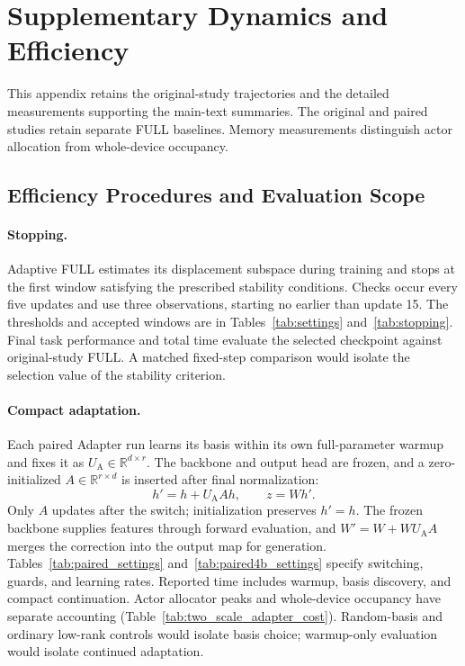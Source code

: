 \FloatBarrier
\section{Supplementary Dynamics and Efficiency}
\label{app:supplementary}
This appendix retains the original-study trajectories and the detailed measurements supporting the main-text summaries. The original and paired studies retain separate FULL baselines. Memory measurements distinguish actor allocation from whole-device occupancy.
\subsection{Efficiency Procedures and Evaluation Scope}
\label{app:efficiency_procedures}
\paragraph{Stopping.}
Adaptive FULL estimates its displacement subspace during training and stops at the first window satisfying the prescribed stability conditions. Checks occur every five updates and use three observations, starting no earlier than update 15. The thresholds and accepted windows are in Tables~\ref{tab:settings} and~\ref{tab:stopping}. Final task performance and total time evaluate the selected checkpoint against original-study FULL. A matched fixed-step comparison would isolate the selection value of the stability criterion.

\paragraph{Compact adaptation.}
Each paired Adapter run learns its basis within its own full-parameter warmup and fixes it as $U_{\mathrm A}\in\mathbb R^{d\times r}$. The backbone and output head are frozen, and a zero-initialized $A\in\mathbb R^{r\times d}$ is inserted after final normalization:
\begin{equation}
h'=h+U_{\mathrm A}Ah,\qquad z=Wh'.
\label{eq:adapter}
\end{equation}
Only $A$ updates after the switch; initialization preserves $h'=h$. The frozen backbone supplies features through forward evaluation, and $W'=W+WU_{\mathrm A}A$ merges the correction into the output map for generation. Tables~\ref{tab:paired_settings} and~\ref{tab:paired4b_settings} specify switching, guards, and learning rates. Reported time includes warmup, basis discovery, and compact continuation. Actor allocator peaks and whole-device occupancy have separate accounting (Table~\ref{tab:two_scale_adapter_cost}). Random-basis and ordinary low-rank controls would isolate basis choice; warmup-only evaluation would isolate continued adaptation.

